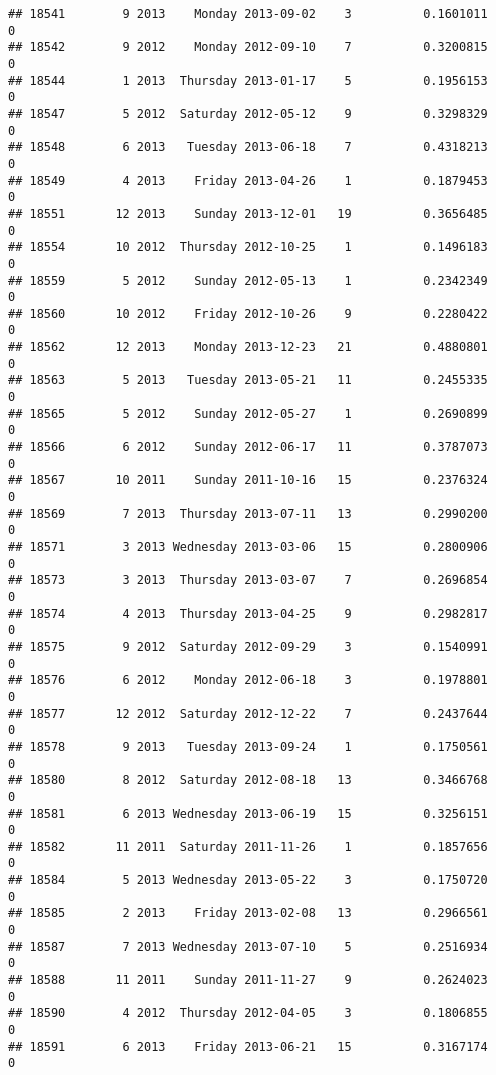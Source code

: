 \documentclass[
]{article}
\begin{document}
\begin{verbatim}
## 18541        9 2013    Monday 2013-09-02    3          0.1601011             0
## 18542        9 2012    Monday 2012-09-10    7          0.3200815             0
## 18544        1 2013  Thursday 2013-01-17    5          0.1956153             0
## 18547        5 2012  Saturday 2012-05-12    9          0.3298329             0
## 18548        6 2013   Tuesday 2013-06-18    7          0.4318213             0
## 18549        4 2013    Friday 2013-04-26    1          0.1879453             0
## 18551       12 2013    Sunday 2013-12-01   19          0.3656485             0
## 18554       10 2012  Thursday 2012-10-25    1          0.1496183             0
## 18559        5 2012    Sunday 2012-05-13    1          0.2342349             0
## 18560       10 2012    Friday 2012-10-26    9          0.2280422             0
## 18562       12 2013    Monday 2013-12-23   21          0.4880801             0
## 18563        5 2013   Tuesday 2013-05-21   11          0.2455335             0
## 18565        5 2012    Sunday 2012-05-27    1          0.2690899             0
## 18566        6 2012    Sunday 2012-06-17   11          0.3787073             0
## 18567       10 2011    Sunday 2011-10-16   15          0.2376324             0
## 18569        7 2013  Thursday 2013-07-11   13          0.2990200             0
## 18571        3 2013 Wednesday 2013-03-06   15          0.2800906             0
## 18573        3 2013  Thursday 2013-03-07    7          0.2696854             0
## 18574        4 2013  Thursday 2013-04-25    9          0.2982817             0
## 18575        9 2012  Saturday 2012-09-29    3          0.1540991             0
## 18576        6 2012    Monday 2012-06-18    3          0.1978801             0
## 18577       12 2012  Saturday 2012-12-22    7          0.2437644             0
## 18578        9 2013   Tuesday 2013-09-24    1          0.1750561             0
## 18580        8 2012  Saturday 2012-08-18   13          0.3466768             0
## 18581        6 2013 Wednesday 2013-06-19   15          0.3256151             0
## 18582       11 2011  Saturday 2011-11-26    1          0.1857656             0
## 18584        5 2013 Wednesday 2013-05-22    3          0.1750720             0
## 18585        2 2013    Friday 2013-02-08   13          0.2966561             0
## 18587        7 2013 Wednesday 2013-07-10    5          0.2516934             0
## 18588       11 2011    Sunday 2011-11-27    9          0.2624023             0
## 18590        4 2012  Thursday 2012-04-05    3          0.1806855             0
## 18591        6 2013    Friday 2013-06-21   15          0.3167174             0

\end{verbatim}
\end{document}
